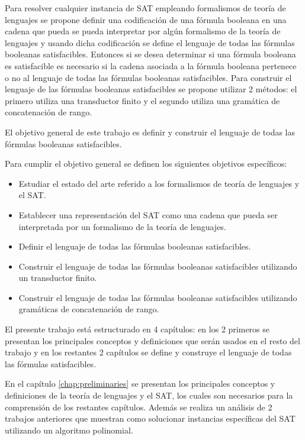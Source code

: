 \documentclass[12pt]{article}
\begin{document}
Para resolver cualquier instancia de SAT empleando formalismos de teoría de lenguajes se propone definir una codificación
de una fórmula booleana en una cadena que pueda se pueda interpretar por algún formalismo de la teoría de lenguajes
y usando dicha codificación se define el lenguaje de todas las fórmulas booleanas satisfacibles. Entonces si se desea
determinar si una fórmula booleana es satisfacible es necesario si la cadena asociada a la  fórmula booleana pertenece o no al lenguaje de todas las fórmulas booleanas satisfacibles. Para construir el lenguaje
de las fórmulas booleanas satisfacibles se propone utilizar 2 métodos: el primero utiliza una transductor finito y el segundo
utiliza una gramática de concatenación de rango.

El objetivo general de este trabajo es definir y construir el lenguaje de todas las fórmulas booleanas satisfacibles.

Para cumplir el objetivo general se definen los siguientes objetivos específicos:

\begin{itemize}
      \item Estudiar el estado del arte referido a los formalismos de teoría de lenguajes y el SAT.
      \item Establecer una representación del SAT como una cadena que pueda ser interpretada por un formalismo de la teoría de lenguajes.
      \item Definir el lenguaje de todas las fórmulas booleanas satisfacibles.
      \item Construir el lenguaje de todas las fórmulas booleanas satisfacibles utilizando un transductor finito.
      \item Construir el lenguaje de todas las fórmulas booleanas satisfacibles utilizando gramáticas de concatenación de rango.
\end{itemize}

El presente trabajo está estructurado en 4 capítulos: en los 2 primeros se presentan los principales conceptos y definiciones
que serán usados en el resto del trabajo y en los restantes 2 capítulos se define y construye el lenguaje de todas las fórmulas satisfacibles.

En el capítulo \ref{chap:preliminaries} se presentan los principales conceptos y definiciones de la teoría de lenguajes y el SAT, los cuales
son necesarios para la comprensión de los restantes capítulos. Además se realiza un análisis de 2 trabajos anteriores
que muestran como solucionar instancias específicas del SAT utilizando un algoritmo polinomial.
\end{document}
